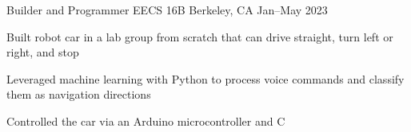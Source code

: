 \experience
{Builder and Programmer}
{EECS 16B}
{Berkeley, CA}
{Jan--May 2023}
{
	\item Built robot car in a lab group from scratch that can drive straight, turn left or right, and stop 
	\item Leveraged machine learning with Python to process voice commands and classify them as navigation directions
	\item Controlled the car via an Arduino microcontroller and C
}
